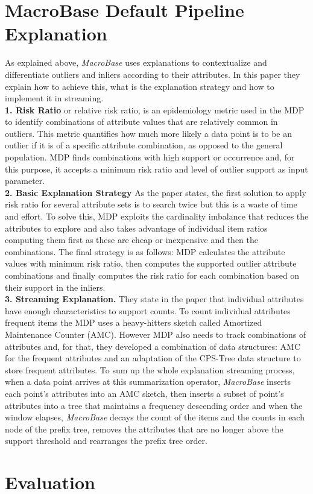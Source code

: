 \documentclass[11pt, titlepage]{article}
\begin{document}
	\section{MacroBase Default Pipeline Explanation}
	\begin{flushleft}
		As explained above, \textit{MacroBase} uses explanations to contextualize and differentiate outliers and inliers according to their attributes. In this paper they explain how to achieve this,  what is the explanation strategy and how to implement it in streaming.
		\\\textbf{1. Risk Ratio} or relative risk ratio, is an epidemiology metric used in the MDP to identify combinations of attribute values that are relatively common in outliers. This metric quantifies how much more likely a data point is to be an outlier if it is of a specific attribute combination, as opposed to the general population. MDP finds combinations with high support or occurrence and, for this purpose, it accepts a minimum risk ratio and level of outlier support as input parameter.
		\\\textbf{2. Basic Explanation Strategy} As the paper states, the first solution to apply risk ratio for several attribute sets is to search twice but this is a waste of time and effort. To solve this, MDP exploits the cardinality imbalance that reduces the attributes to explore and also takes advantage of individual item ratios computing them first as these are cheap or inexpensive and then the combinations. The final strategy is as follows: MDP calculates the attribute values with minimum risk ratio, then computes the supported outlier attribute combinations and finally computes the risk ratio for each combination based on their support in the inliers.
		\\\textbf{3. Streaming Explanation.} They state in the paper that individual attributes have enough characteristics to support counts. To count individual attributes frequent items the MDP uses a heavy-hitters sketch called Amortized Maintenance Counter (AMC). However MDP also needs to track combinations of attributes and, for that, they developed a combination of data structures: AMC for the frequent attributes and an adaptation of the CPS-Tree data structure to store frequent attributes. To sum up the whole explanation streaming process, when a data point arrives at this summarization operator, \textit{MacroBase} inserts each point's attributes into an AMC sketch, then inserts a subset of point's attributes into a tree that maintains a frequency descending order and when the window elapses, \textit{MacroBase} decays the count of the items and the counts in each node of the prefix tree, removes the attributes that are no longer above the support threshold and rearranges the prefix tree order.
	\end{flushleft}
	\section{Evaluation}
	\begin{flushleft}
		
	\end{flushleft}
\end{document}

